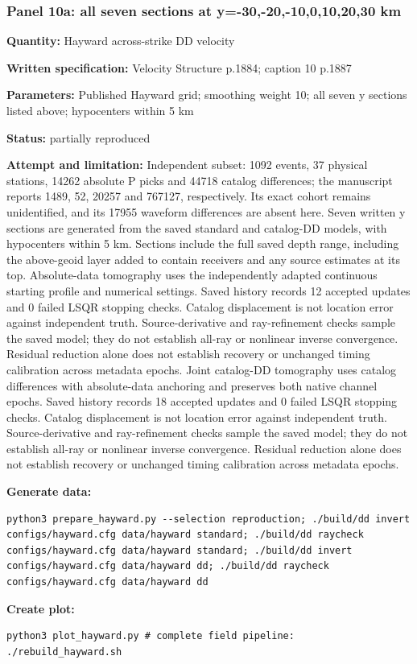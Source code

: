 \subsubsection*{Panel 10a: all seven sections at y=-30,-20,-10,0,10,20,30 km}
\noindent\textbf{Quantity:} Hayward across-strike DD velocity\par
\noindent\textbf{Written specification:} Velocity Structure p.1884; caption 10 p.1887\par
\noindent\textbf{Parameters:} Published Hayward grid; smoothing weight 10; all seven y sections listed above; hypocenters within 5 km\par
\noindent\textbf{Status:} partially reproduced\par
\noindent\textbf{Attempt and limitation:} Independent subset: 1092 events, 37 physical stations, 14262 absolute P picks and 44718 catalog differences; the manuscript reports 1489, 52, 20257 and 767127, respectively. Its exact cohort remains unidentified, and its 17955 waveform differences are absent here. Seven written y sections are generated from the saved standard and catalog-DD models, with hypocenters within 5 km. Sections include the full saved depth range, including the above-geoid layer added to contain receivers and any source estimates at its top. Absolute-data tomography uses the independently adapted continuous starting profile and numerical settings. Saved history records 12 accepted updates and 0 failed LSQR stopping checks. Catalog displacement is not location error against independent truth. Source-derivative and ray-refinement checks sample the saved model; they do not establish all-ray or nonlinear inverse convergence. Residual reduction alone does not establish recovery or unchanged timing calibration across metadata epochs. Joint catalog-DD tomography uses catalog differences with absolute-data anchoring and preserves both native channel epochs. Saved history records 18 accepted updates and 0 failed LSQR stopping checks. Catalog displacement is not location error against independent truth. Source-derivative and ray-refinement checks sample the saved model; they do not establish all-ray or nonlinear inverse convergence. Residual reduction alone does not establish recovery or unchanged timing calibration across metadata epochs.\par
\noindent\textbf{Generate data:}
\begin{lstlisting}
python3 prepare_hayward.py --selection reproduction; ./build/dd invert configs/hayward.cfg data/hayward standard; ./build/dd raycheck configs/hayward.cfg data/hayward standard; ./build/dd invert configs/hayward.cfg data/hayward dd; ./build/dd raycheck configs/hayward.cfg data/hayward dd
\end{lstlisting}
\noindent\textbf{Create plot:}
\begin{lstlisting}
python3 plot_hayward.py # complete field pipeline: ./rebuild_hayward.sh
\end{lstlisting}
